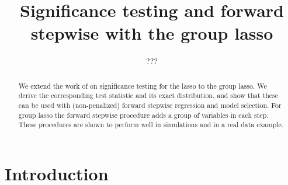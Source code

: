 \documentclass{imsart}
\begin{document}
\begin{frontmatter}

\title{Significance testing and forward stepwise with the group lasso}


\author{ 
\and {} 
\and ???}


\address{Department of Statistics\\  Stanford University\\ Sequoia
Hall \\390 Serra Mall\\ Stanford, CA 94305, U.S.A.\\ }


\begin{abstract}
  We extend the work of \cite{significance:lasso} on significance
  testing for the lasso to the group lasso.  We derive the corresponding
  test statistic and its exact distribution, and show that these can be
  used with (non-penalized) forward stepwise regression and model
  selection.  For group lasso the forward stepwise procedure adds a
  group of variables in each step.  These procedures are shown to
  perform well in simulations and in a real data example.

\end{abstract}

\begin{keyword}[class=AMS]
\end{keyword}

\begin{keyword}
\end{keyword}

\end{frontmatter}


\section{Introduction}\label{sec:intro}
\end{document}

